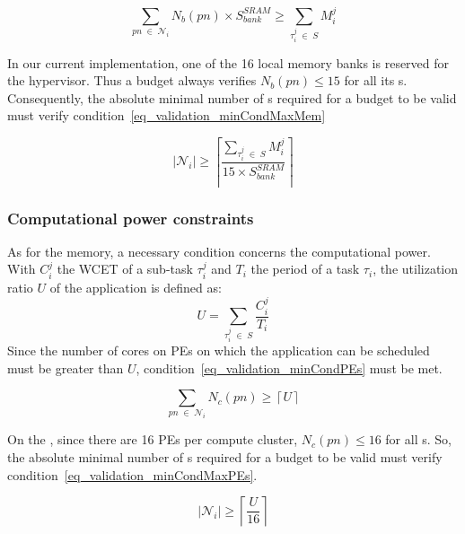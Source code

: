 \documentclass[main.tex]{subfiles}
\begin{document}
\begin{equation}
    \underset{pn \; \in \; \mathcal{N}_i}{\sum} N_b(pn) \times S_{bank}^{SRAM} \geq
    \underset{\tau_i^j \; \in \; S}{\sum} M_i^j
    \label{eq_validation_minCondMem}
\end{equation}

In our current implementation, one of the 16 local memory banks is reserved for
the hypervisor. Thus a budget always verifies $N_b(pn) \leq 15$ for all its
\PN{}s. Consequently, the absolute minimal number of \PN{}s required for a
budget to be valid must verify condition~\ref{eq_validation_minCondMaxMem}

\begin{equation}
    | \mathcal{N}_i | \geq 
    \left\lceil \dfrac{  \underset{\tau_i^j \; \in \; S}{\sum} M_i^j }{15 \times  S_{bank}^{SRAM}} \right\rceil
    \label{eq_validation_minCondMaxMem}
\end{equation}

\subsubsection{Computational power constraints}
As for the memory, a necessary condition concerns the computational power. With
$C_i^j$ the WCET of a sub-task $\tau_i^j$ and $T_i$ the period of a task
$\tau_i$, the utilization ratio $U$ of the application is defined as:
\begin{displaymath}
    U = \underset{\tau_i^j \; \in \; S}{\sum} \dfrac{C_i^j}{T_i}
\end{displaymath}
Since the number of cores on PEs on which the application can be scheduled must
be greater than $U$, condition~\ref{eq_validation_minCondPEs} must be met.

\begin{equation}
    \underset{pn \; \in \; \mathcal{N}_i}{\sum} N_c(pn) \geq \left\lceil U \right\rceil
    \label{eq_validation_minCondPEs}
\end{equation}

On the \mppalong, since there are 16 PEs per compute cluster, $N_c(pn) \leq 16$
for all \PN{}s. So, the absolute minimal number of \PN{}s required for a budget
to be valid must verify condition~\ref{eq_validation_minCondMaxPEs}.

\begin{equation}
    | \mathcal{N}_i | \geq \left\lceil \dfrac{U}{16} \right\rceil
    \label{eq_validation_minCondMaxPEs}
\end{equation}
\end{document}
